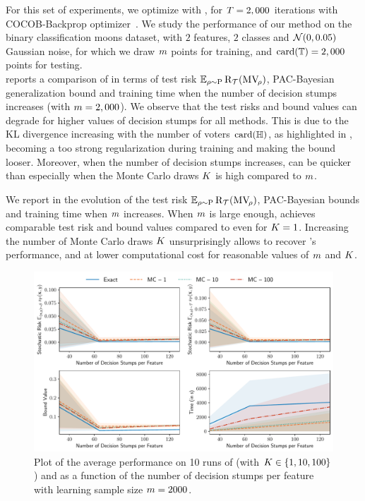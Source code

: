 For this set of experiments, we optimize  with , for $T=2,000$ iterations with COCOB-Backprop optimizer~\citep{OrabonaTommasi2017}.
We study the performance of our method on the binary classification moons dataset, with $2$ features, $2$ classes and $\mathcal{N}(0, 0.05)$ Gaussian noise, for which we draw $m$ points for training, and $\operatorname{card}(\mathbb{T})=2,000$ points for testing.\\

 reports a comparison of  in terms of test risk $\operatorname*{\mathbb{E}}_{\rho\sim\mathrm{P}}\text{R}_{\mathcal{T}}(\text{MV}_{\!\rho})$, PAC-Bayesian generalization bound and training time when the number of decision stumps increases (with $m=2,000$).
We observe that the test risks and bound values can degrade for higher values of decision stumps for all methods.
This is due to the KL divergence increasing with the number of voters $\operatorname{card}(\mathbb{H})$, as highlighted in , becoming a too strong regularization during training and making the bound looser. 
Moreover, when the number of decision stumps increases,  can be quicker than  especially when the Monte Carlo draws $K$ is high compared to $m$. 

We report in  the evolution of the test risk $\operatorname*{\mathbb{E}}_{\rho\sim\mathrm{P}}\text{R}_{\mathcal{T}}(\text{MV}_{\!\rho})$, PAC-Bayesian bounds and training time when $m$ increases.
When $m$ is large enough,  achieves comparable test risk and bound values compared to  even for $K=1$.
Increasing the number of Monte Carlo draws $K$ unsurprisingly allows to recover 's performance, and at lower computational cost for reasonable values of $m$ and $K$.

\begin{figure}
    \centering
    \includegraphics[width=1.0\linewidth]{chapter_5/figures/moons_voter.pdf}
    \caption[Plot of the Performance of  on Moons (1/2)]{Plot of the average performance on 10 runs of  (with $K\in\{1, 10, 100\}$) and  as a function of the number of decision stumps per feature with learning sample size $m=2000$.}
    \label{chap:mv-sto:fig:moons-voter}
\end{figure}

